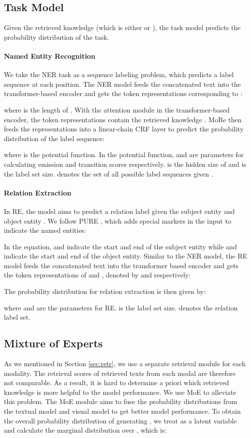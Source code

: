 \documentclass[11pt]{article}
\begin{document}
\subsection{Task Model}
Given the retrieved knowledge  (which is either  or ), the task model predicts the probability distribution  of the task. 


\paragraph{Named Entity Recognition} We take the NER task as a sequence labeling problem, which predicts a label sequence  at each position. 
The NER model feeds the concatenated text  into the transformer-based encoder and gets the token representations  corresponding to :

where  is the length of . With the attention module in the transformer-based encoder, the token representations  contain the retrieved knowledge . MoRe then feeds the representations into a linear-chain CRF layer to predict the probability distribution  of the label sequence:

where  is the potential function. In the potential function,  and  are parameters for calculating emission and transition scores respectively.  is the hidden size of  and  is the label set size.  denotes the set of all possible label sequences given .

\paragraph{Relation Extraction} In RE, the model aims to predict a relation label  given the subject entity  and object entity .
We follow PURE \citep{zhong-chen-2021-frustratingly}, which adds special markers in the input  to indicate the named entities:

In the equation,  and  indicate the start and end of the subject entity while  and  indicate the start and end of the object entity. Similar to the NER model, the RE model feeds the concatenated text  into the transformer based encoder and gets the token representations of  and , denoted by  and  respectively:

The probability distribution  for relation extraction is then given by:

where  and  are the parameters for RE.  is the label set size.  denotes the relation label set.

\subsection{Mixture of Experts}
\label{sec:moe}
As we mentioned in Section \ref{sec:retr}, we use a separate retrieval module for each modality. The retrieval scores of retrieved texts from each modal are therefore not comparable. As a result, it is hard to determine a priori which retrieved knowledge is more helpful to the model performance. We use MoE to alleviate this problem. The MoE module aims to fuse the probability distributions from the textual model and visual model to get better model performance. To obtain the overall probability distribution of generating , we treat  as a latent variable and calculate the marginal distribution over , which is:
\end{document}

